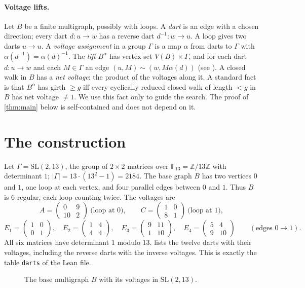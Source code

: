 \documentclass[11pt]{article}
\numberwithin{equation}{section}
\theoremstyle{definition}
\theoremstyle{remark}
\newcommand{\SL}{\mathrm{SL}}
\newcommand{\F}{\mathbb F}
\newcommand{\Z}{\mathbb Z}
\newcommand{\mat}[4]{\left(\begin{smallmatrix}#1&#2\\#3&#4\end{smallmatrix}\right)}
\begin{document}
\paragraph{Voltage lifts.}
Let $B$ be a finite multigraph, possibly with loops. A \emph{dart} is an edge with a chosen
direction; every dart $d\colon u\to w$ has a reverse dart $d^{-1}\colon w\to u$. A loop gives two
darts $u\to u$. A \emph{voltage assignment} in a group $\Gamma$ is a map $\alpha$ from darts to $\Gamma$ with
$\alpha(d^{-1})=\alpha(d)^{-1}$. The \emph{lift} $B^\alpha$ has vertex set $V(B)\times\Gamma$, and
for each dart $d\colon u\to w$ and each $M\in\Gamma$ an edge $(u,M)\sim(w,M\alpha(d))$
(see \cite{GT}). A closed walk in $B$ has a \emph{net voltage}: the product of the voltages
along it. A standard fact \cite{GT,EJ} is that $B^\alpha$ has girth $\ge g$ iff every cyclically
reduced closed walk of length $<g$ in $B$ has net voltage $\ne 1$. We use this fact only to guide
the search. The proof of \cref{thm:main} below is self-contained and does not depend on it.

\section{The construction}\label{sec:construction}

Let $\Gamma=\SL(2,13)$, the group of $2\times2$ matrices over $\F_{13}=\Z/13\Z$ with
determinant $1$; $|\Gamma|=13\cdot(13^2-1)=2184$.
The base graph $B$ has two vertices $0$ and $1$, one loop at each vertex, and four parallel edges
between $0$ and $1$. Thus $B$ is $6$-regular, each loop counting twice. The voltages are
\[
  A=\mat{0}{9}{10}{2}\ \text{(loop at $0$)},\qquad
  C=\mat{1}{0}{8}{1}\ \text{(loop at $1$)},
\]
\[
  E_1=\mat{1}{0}{0}{1},\quad E_2=\mat{1}{4}{4}{4},\quad E_3=\mat{9}{11}{1}{10},\quad E_4=\mat{5}{4}{9}{10}
  \qquad (\text{edges } 0\to 1).
\]
All six matrices have determinant $1$ modulo $13$.  lists the twelve darts with
their voltages, including the reverse darts with the inverse voltages. This is exactly the table
\texttt{darts} of the Lean file.

\begin{figure}[ht]
\centering
{}
\caption{The base multigraph $B$ with its voltages in $\SL(2,13)$.}
\label{fig:base}
\end{figure}
\end{document}
